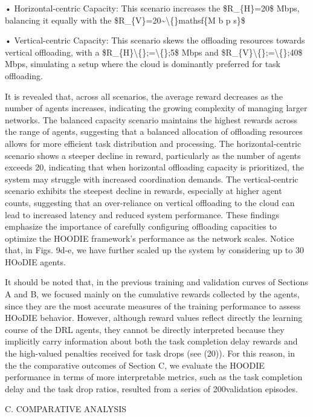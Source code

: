 \documentclass{article}
\begin{document}
• Horizontal-centric Capacity: This scenario increases the \$R\_\{H\}=20\$ Mbps, balancing it equally with the 
\$R\_\{V\}=20\textasciitilde{}\textbackslash\{\}mathsf\{M b p s\}\$

• Vertical-centric Capacity: This scenario skews the offloading resources towards vertical offloading, with a \$R\_\{H\}\textbackslash\{\};=\textbackslash\{\};5\$ Mbps and \$R\_\{V\}\textbackslash\{\};=\textbackslash\{\};40\$ Mbps, simulating a setup where the cloud is dominantly preferred for task offloading.

It is revealed that, across all scenarios, the average reward decreases as the number of agents increases, indicating the growing complexity of managing larger networks. The balanced capacity scenario maintains the highest rewards across the range of agents, suggesting that a balanced allocation of offloading resources allows for more efficient task distribution and processing. The horizontal-centric scenario shows a steeper decline in reward, particularly as the number of agents exceeds 20, indicating that when horizontal offloading capacity is prioritized, the system may struggle with increased coordination demands. The vertical-centric scenario exhibits the steepest decline in rewards, especially at higher agent counts, suggesting that an over-reliance on vertical offloading to the cloud can lead to increased latency and reduced system performance. These findings emphasize the importance of carefully configuring offloading capacities to optimize the HOODIE framework's performance as the network scales. Notice that, in Figs. 9d-e, we have further scaled up the system by considering up to 30 HOoDIE agents.

It should be noted that, in the previous training and validation curves of Sections A and B, we focused mainly on the cumulative rewards collected by the agents, since they are the most accurate measures of the training performance to assess HOoDIE behavior. However, although reward values reflect directly the learning course of the DRL agents, they cannot be directly interpreted because they implicitly carry information about both the task completion delay rewards and the high-valued penalties received for task drops (see (20)). For this reason, in the the comparative outcomes of Section C, we evaluate the HOODIE performance in terms of more interpretable metrics, such as the task completion delay and the task drop ratios, resulted from a series of 200validation episodes.

C. COMPARATIVE ANALYSIS
\end{document}
